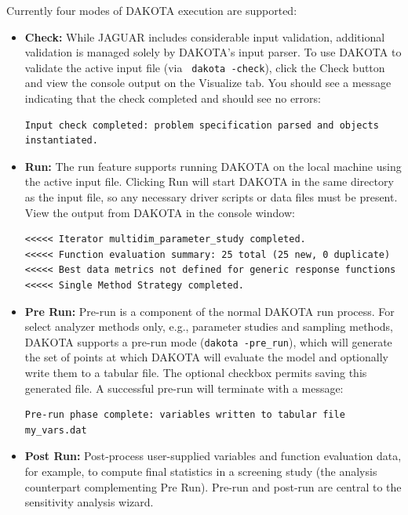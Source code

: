 Currently four modes of DAKOTA execution are supported:
\begin{itemize}

\item {\bf Check:} While JAGUAR includes considerable input
validation, additional validation is managed solely by DAKOTA's input
parser.  To use DAKOTA to validate the active input file (via {\tt
dakota -check}), click the Check button and view the console output on
the Visualize tab.  You should see a message indicating that the check
completed and should see no errors:

\begin{small}
\begin{verbatim}
Input check completed: problem specification parsed and objects instantiated.
\end{verbatim}
\end{small}

\item {\bf Run:} The run feature supports running DAKOTA on the local
machine using the active input file.  Clicking Run will start DAKOTA
in the same directory as the input file, so any necessary driver
scripts or data files must be present.  View the output from DAKOTA in
the console window:

\begin{verbatim}
<<<<< Iterator multidim_parameter_study completed.
<<<<< Function evaluation summary: 25 total (25 new, 0 duplicate)
<<<<< Best data metrics not defined for generic response functions
<<<<< Single Method Strategy completed.
\end{verbatim}

\item {\bf Pre Run:} Pre-run is a component of the normal DAKOTA run
process.  For select analyzer methods only, e.g., parameter studies
and sampling methods, DAKOTA supports a pre-run mode ({\tt dakota
-pre\_run}), which will generate the set of points at which DAKOTA
will evaluate the model and optionally write them to a tabular file.
The optional checkbox permits saving this generated file.  A
successful pre-run will terminate with a message:

\begin{small}
\begin{verbatim}
Pre-run phase complete: variables written to tabular file my_vars.dat
\end{verbatim}
\end{small}

\item {\bf Post Run:} Post-process user-supplied variables and
function evaluation data, for example, to compute final statistics in
a screening study (the analysis counterpart complementing Pre Run).
Pre-run and post-run are central to the sensitivity analysis wizard.

\end{itemize}

